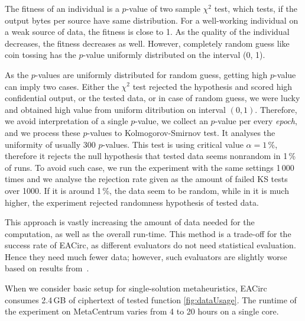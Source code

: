 \documentclass[
  print, %
  Table,   %
  nolof,     %
  nolot,     %
  11pt, %
  oneside  %
]{fithesis3}
\begin{document}
The fitness of an individual is a $p$-value of two sample $\chi^{2}$ test, which tests, if the output bytes per source have same distribution. For a well-working individual on a weak source of data, the fitness is close to 1. As the quality of the individual decreases, the fitness decreases as well. However, completely random guess like coin tossing has the $p$-value uniformly distributed on the interval (0, 1).

As the $p$-values are uniformly distributed for random guess, getting high $p$-value can imply two cases. Either the $\chi^{2}$ test rejected the hypothesis and scored high confidential output, or the tested data, or in case of random guess, we were lucky and obtained high value from uniform ditribution on interval $(0, 1)$. Therefore, we avoid interpretation of a single $p$-value, we collect an $p$-value per every \textit{epoch}, and we process these $p$-values to Kolmogorov-Smirnov test. It analyses the uniformity of usually 300 $p$-values. This test is using critical value $\alpha = 1\,\%$, therefore it rejects the null hypothesis that tested data seems nonrandom in 1\,\% of runs. To avoid such case, we run the experiment with the same settings 1\,000 times and we analyse the rejection rate given as the amount of failed KS tests over 1000. If it is around 1\,\%, the data seem to be random, while in it is much higher, the experiment rejected randomness hypothesis of tested data.

This approach is vastly increasing the amount of data needed for the computation, as well as the overall run-time. This method is a trade-off for the success rate of EACirc, as different evaluators do not need statistical evaluation. Hence they need much fewer data; however, such evaluators are slightly worse based on results from~\cite{svenda2013towards}.

When we consider basic setup for single-solution metaheuristics, EACirc consumes 2.4\,GB of ciphertext of tested function \cref{fig:dataUsage}. The runtime of the experiment on MetaCentrum varies from 4 to 20 hours on a single core.
\end{document}
